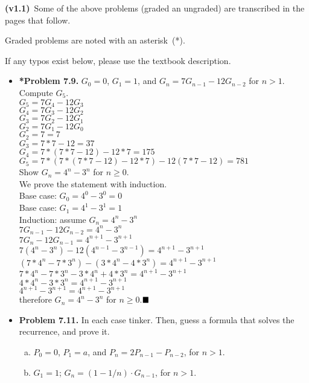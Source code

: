 \documentclass[11pt]{article}
\begin{document}
\textbf{(v1.1)}~Some of the above problems (graded an ungraded)
are transcribed in the pages that follow.

Graded problems are noted with an asterisk~(*).

If any typos exist below, please use the textbook description.

\newpage
\begin{itemize}

\item \textbf{*Problem 7.9.}
$G_0=0$, $G_1=1$, and $G_n=7G_{n-1}-12G_{n-2}$ for $n>1$.
Compute $G_5$.
\\$G_5=7G_4-12G_3$
\\$G_4=7G_3-12G_2$
\\$G_3=7G_2-12G_1$
\\$G_2=7G_1-12G_0$
\\$G_2=7=7$
\\$G_3=7*7-12=37$
\\$G_4=7*(7*7-12)-12*7=175$
\\$G_5=7*(7*(7*7-12)-12*7)-12(7*7-12)=781$
\\
Show $G_n=4^n-3^n$ for $n\ge 0$.
\\We prove the statement with induction.
\\Base case: $G_0=4^0-3^0=0$
\\Base case: $G_1=4^1-3^1=1$
\\Induction: assume $G_n=4^n-3^n$
\\$7G_{n-1}-12G_{n-2}=4^n-3^n$
\\$7G_{n}-12G_{n-1}=4^{n+1}-3^{n+1}$
\\$7(4^n-3^n)-12(4^{n-1}-3^{n-1})=4^{n+1}-3^{n+1}$
\\$(7*4^n-7*3^n)-(3*4^{n}-4*3^{n})=4^{n+1}-3^{n+1}$
\\$7*4^n-7*3^n-3*4^{n}+4*3^{n}=4^{n+1}-3^{n+1}$
\\$4*4^n-3*3^n=4^{n+1}-3^{n+1}$
\\$4^{n+1}-3^{n+1}=4^{n+1}-3^{n+1}$
\\therefore $G_n=4^n-3^n$ for $n\ge 0$.$\hfill\blacksquare$

\vspace{0.1in}

\item \textbf{Problem 7.11.}
In each case tinker.
Then, guess a formula that solves the recurrence, and prove it.
\begin{enumerate}[(a)]
\item $P_0=0$, $P_1=a$, and $P_n=2P_{n-1}-P_{n-2}$, for $n>1$.
\item $G_1=1$; $G_n=(1-1/n)\cdot G_{n-1}$, for $n>1$.
\end{enumerate}


\end{itemize}
\end{document}
